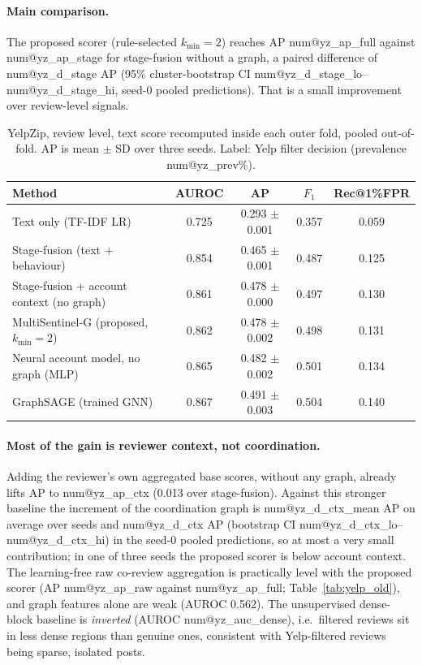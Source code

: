 \documentclass[pdflatex,sn-basic]{sn-jnl}
\makeatletter
\theoremstyle{thmstyleone}
\theoremstyle{thmstylethree}
\newcommand{\num}[1]{\csname num@#1\endcsname}
\makeatother
\begin{document}
\paragraph{Main comparison.} The proposed scorer (rule-selected $k_{\min}=2$) reaches AP \num{yz_ap_full} against \num{yz_ap_stage} for stage-fusion without a graph, a paired difference of \num{yz_d_stage} AP (95\% cluster-bootstrap CI \num{yz_d_stage_lo}--\num{yz_d_stage_hi}, seed-0 pooled predictions). That is a small improvement over review-level signals.

\begin{table}[t]
\caption{YelpZip, review level, text score recomputed inside each outer fold, pooled out-of-fold. AP is mean $\pm$ SD over three seeds. Label: Yelp filter decision (prevalence \num{yz_prev}\%).}\label{tab:yelp}
\small\setlength{\tabcolsep}{3pt}
\begin{tabular}{@{}lcccc@{}}
\toprule
Method & AUROC & AP & $F_1$ & Rec@1\%FPR \\
\midrule
Text only (TF-IDF LR) & 0.725 & 0.293 $\pm$ 0.001 & 0.357 & 0.059 \\
Stage-fusion (text + behaviour) & 0.854 & 0.465 $\pm$ 0.001 & 0.487 & 0.125 \\
Stage-fusion + account context (no graph) & 0.861 & 0.478 $\pm$ 0.000 & 0.497 & 0.130 \\
MultiSentinel-G (proposed, $k_{\min}=2$) & 0.862 & 0.478 $\pm$ 0.002 & 0.498 & 0.131 \\
Neural account model, no graph (MLP) & 0.865 & 0.482 $\pm$ 0.002 & 0.501 & 0.134 \\
GraphSAGE (trained GNN) & 0.867 & 0.491 $\pm$ 0.003 & 0.504 & 0.140 \\
\bottomrule
\end{tabular}
\end{table}

\paragraph{Most of the gain is reviewer context, not coordination.} Adding the reviewer's own aggregated base scores, without any graph, already lifts AP to \num{yz_ap_ctx} (0.013 over stage-fusion). Against this stronger baseline the increment of the coordination graph is \num{yz_d_ctx_mean} AP on average over seeds and \num{yz_d_ctx} AP (bootstrap CI \num{yz_d_ctx_lo}--\num{yz_d_ctx_hi}) in the seed-0 pooled predictions, so at most a very small contribution; in one of three seeds the proposed scorer is below account context. The learning-free raw co-review aggregation is practically level with the proposed scorer (AP \num{yz_ap_raw} against \num{yz_ap_full}; Table~\ref{tab:yelp_old}), and graph features alone are weak (AUROC 0.562). The unsupervised dense-block baseline is \emph{inverted} (AUROC \num{yz_auc_dense}), i.e.\ filtered reviews sit in less dense regions than genuine ones, consistent with Yelp-filtered reviews being sparse, isolated posts.
\end{document}
